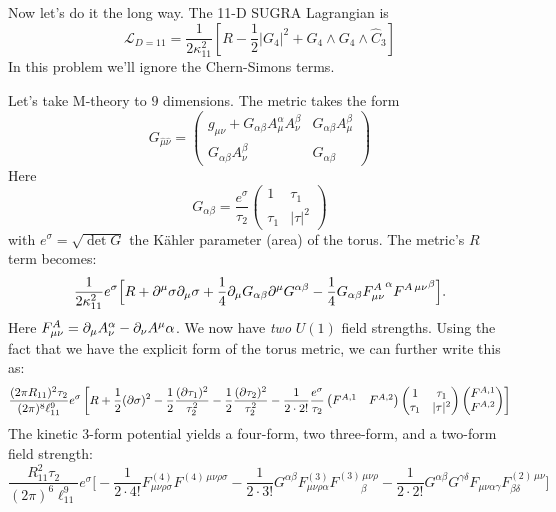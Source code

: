 \documentclass[11pt, class=article, crop=false]{standalone}
\begin{document}
\begin{enumerate}
	Now let's do it the long way. 
	The 11-D SUGRA Lagrangian is
	\[
		\mathcal L_{D=11} = \frac{1}{2\kappa_{11}^2}\left[R - \frac12 |G_4|^2 + G_4 \wedge G_4 \wedge \hat C_3 \right]
	\]
	In this problem we'll ignore the Chern-Simons terms. 
	
	Let's take M-theory to $9$ dimensions. The metric takes the form
	\[
		G_{\hat \mu \hat \nu} = \begin{pmatrix}
			g_{\mu \nu} + G_{\alpha \beta} A_\mu^\alpha A_\nu^\beta & G_{\alpha \beta} A^\beta_\mu \\
			G_{\alpha \beta} A_\nu^\beta  & G_{\alpha \beta}
		\end{pmatrix}
	\]
	Here
	\[
		G_{\alpha \beta} = \frac{e^{\sigma}}{\tau_2} \begin{pmatrix}
			1 & \tau_1\\
			\tau_1 & |\tau|^2
		\end{pmatrix}
	\]
	with $e^{\sigma} = \sqrt{\det G}$ the K\"ahler parameter (area) of the torus. 
	The metric's $R$ term becomes:
	\[
		\frac{1}{2 \kappa_{11}^2} e^{\sigma} \Big[R + \partial^\mu \sigma \partial_\mu \sigma + \frac14 \partial_\mu G_{\alpha \beta} \partial^\mu G^{\alpha \beta} - \frac14 G_{\alpha \beta} {F_{\mu \nu}^A}^\alpha {F^{A\, \mu \nu}}^\beta \Big].
	\]
	Here $F_{\mu \nu}^A = \partial_\mu A_\nu^\alpha - \partial_\nu A^\mu \alpha$. We now have \emph{two} $U(1)$ field strengths. Using the fact that we have the explicit form of the torus metric, we can further write this as:
	\begin{equation}\label{eq:MframeLag}
		\frac{(2\pi R_{11})^2 \tau_2}{(2\pi)^8 \ell_{11}^9} e^\sigma \left[R + \frac12 (\partial\sigma)^2 - \frac12 \frac{(\partial \tau_1)^2}{\tau_2^2} - \frac12 \frac{(\partial\tau_2)^2}{\tau_2^2} - \frac{1}{2\cdot 2!} \frac{e^{\sigma}}{\tau_2} \begin{pmatrix}
			F^{A,1} & F^{A,2}
		\end{pmatrix}\begin{pmatrix}
			1 & \tau_1\\ \tau_1 & |\tau|^2
		\end{pmatrix}\begin{pmatrix}
			F^{A,1}\\ F^{A,2}
		\end{pmatrix} \right]
	\end{equation}
	The kinetic 3-form potential yields a four-form, two three-form, and a two-form field strength:
	\[
		\frac{R_{11}^2 \tau_2}{(2 \pi)^6 \ell_{11}^9} e^{\sigma} \Big[-\frac{1}{2 \cdot 4!} F_{\mu \nu \rho \sigma}^{(4)} F^{(4)\, \mu \nu \rho \sigma} - \frac{1}{2 \cdot 3!} G^{\alpha \beta} F_{\mu \nu \rho \alpha}^{(3)} F_{\qquad\; \beta}^{(3)\, \mu \nu \rho} - \frac{1}{2 \cdot 2!} G^{\alpha \beta} G^{\gamma \delta} F_{\mu \nu \alpha \gamma} F_{\beta \delta}^{(2)\, \mu \nu}]
\]
\end{enumerate}
\end{document}
